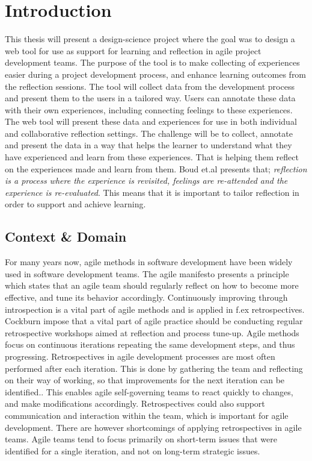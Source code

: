 \chapter{Introduction}
This thesis will present a design-science project where the goal was to design a web tool for use as support for learning and reflection in agile project development teams. The purpose of the tool is to make collecting of experiences easier during a project development process, and enhance learning outcomes from the reflection sessions. The tool will collect data from the development process and present them to the users in a tailored way. Users can annotate these data with their own experiences, including connecting feelings to these experiences. The web tool will present these data and experiences for use in both individual and collaborative reflection settings. The challenge will be to collect, annotate and present the data in a way that helps the learner to understand what they have experienced and learn from these experiences. That is helping them reflect on the experiences made and learn from them. Boud et.al\citep{boudreflection1985} presents that; \emph{reflection is a process where the experience is revisited, feelings are re-attended and the experience is re-evaluated}. This means that it is important to tailor reflection in order to support and achieve learning.

\section{Context \& Domain}
For many years now, agile methods in software development have been widely used in software development teams. The agile manifesto presents a principle which states that an agile team should regularly reflect on how to become more effective, and tune its behavior accordingly\citep{Beck2001}. Continuously improving through introspection is a vital part of agile methods and is applied in f.ex retrospectives\citep{Beck1999, Derby2006, Maham2008}. Cockburn impose that a vital part of agile practice should be conducting regular retrospective workshops aimed at reflection and process tune-up\citep{Cockburn2006}. Agile methods focus on continuous iterations repeating the same development steps, and thus progressing. Retrospectives in agile development processes are most often performed after each iteration. This is done by gathering the team and reflecting on their way of working, so that improvements for the next iteration can be identified.\citep{Derby2006, Drury2011}. This enables agile self-governing teams to react quickly to changes, and make modifications accordingly\citep{Drury2011}. Retrospectives could also support communication and interaction within the team, which is important for agile development. There are however shortcomings of applying retrospectives in agile teams. Agile teams tend to focus primarily on short-term issues that were identified for a single iteration, and not on long-term strategic issues\citep{Drury2011}. 

